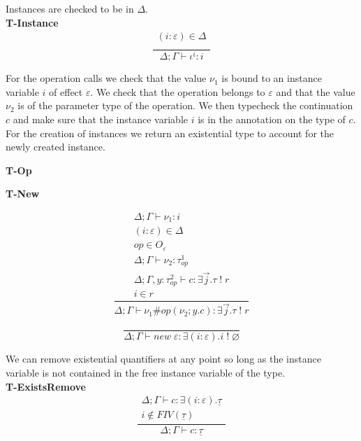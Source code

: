 \documentclass[12pt]{article}
\newcommand\eff[0]{\varepsilon}
\newcommand\Op[0]{O}
\newcommand\op[0]{op}
\newcommand\pty[1]{\ty^1_{#1}}
\newcommand\rty[1]{\ty^2_{#1}}
\newcommand\ty[0]{\tau}
\newcommand\cty[0]{\underline{\ty}}
\newcommand\aty[2]{#1 \; ! \; #2}
\newcommand\texists[3]{\exists(#1:#2) . #3}
\newcommand\texistss[2]{\exists \overrightarrow{#1} . #2}
\newcommand\val[0]{\nu}
\newcommand\comp[0]{c}
\newcommand\copi[5]{#1 \# #2(#3 ; #4 . #5)}
\newcommand\cnew[1]{\textit{new} \; #1}
\begin{document}
Instances are checked to be in $\Delta$.\\
\textbf{T-Instance}
\[\frac{
	\begin{array}{l}
	(i:\eff)\in\Delta \\
	\end{array}
}{
	\Delta;\Gamma \vdash \iota^i : i
}\]



For the operation calls we check that the value $\val_1$ is bound to an instance variable $i$ of effect $\eff$.
We check that the operation belongs to $\eff$ and that the value $\val_2$ is of the parameter type of the operation.
We then typecheck the continuation $c$ and make sure that the instance variable $i$ is in the annotation on the type of $c$. \\
For the creation of instances we return an existential type to account for the newly created instance. \\
\begin{minipage}{0.5\textwidth}
\textbf{T-Op}
\end{minipage}
\begin{minipage}{0.5\textwidth}
\textbf{T-New}
\end{minipage}
\begin{minipage}{0.5\textwidth}
\[\frac{
	\begin{array}{l}
	\Delta;\Gamma \vdash \val_1 : i \\
	(i:\eff)\in\Delta \\
	\op \in \Op_\eff\\
	\Delta;\Gamma \vdash \val_2 : \pty{\op} \\
	\Delta;\Gamma , y : \rty{\op} \vdash \comp : \texistss{j}{\aty{\ty}{r}} \\
	i \in r
	\end{array}
}{
	\Delta;\Gamma \vdash \copi{\val_1}{\op}{\val_2}{y}{\comp} : \texistss{j}{\aty{\ty}{r}}
}\]
\vspace{10pt}
\end{minipage}
\begin{minipage}{0.5\textwidth}
\[\frac{
}{
	\Delta;\Gamma \vdash \cnew{\eff} : \texists{i}{\eff}{\aty{i}{\varnothing}}
}\]
\vspace{10pt}
\end{minipage}
\newpage
We can remove existential quantifiers at any point so long as the instance variable is not contained in the free instance variable of the type. \\
\textbf{T-ExistsRemove}
\[\frac{
	\begin{array}{l}
	\Delta;\Gamma \vdash c : \texists{i}{\eff}{\cty} \\
	i \notin FIV(\cty)
	\end{array}
}{
	\Delta;\Gamma \vdash c : \cty
}\]
\end{document}
